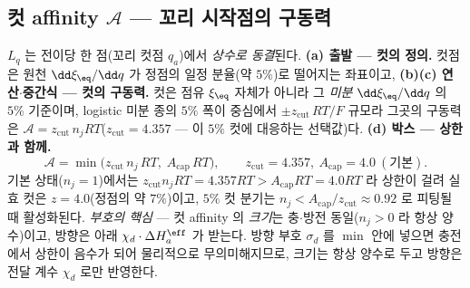 \subsection{컷 affinity $\mathcal A$ --- 꼬리 시작점의 구동력}\label{sec:lag-cut}
$L_q$ 는 전이당 한 점(꼬리 컷점 $q_a$)에서 \emph{상수로 동결}된다. \textbf{(a) 출발 --- 컷의 정의.} 컷점은 원천
$\dd\xi_\eq/\dd q$ 가 정점의 일정 분율(약 $5\%$)로 떨어지는 좌표이고, \textbf{(b)(c) 연산$\cdot$중간식 --- 컷의 구동력.}
컷은 점유 $\xi_\eq$ 자체가 아니라 그 \emph{미분} $\dd\xi_\eq/\dd q$ 의 $5\%$ 기준이며, logistic 미분 종의 $5\%$
폭이 중심에서 $\pm z_\mathrm{cut}\,RT/F$ 규모라 그곳의 구동력은 $\mathcal A=z_\mathrm{cut}\,n_jRT$($z_\mathrm{cut}=4.357$
--- 이 $5\%$ 컷에 대응하는 선택값)다. \textbf{(d) 박스 --- 상한과 함께.}
\begin{equation}
\mathcal A=\min\!\big(z_\mathrm{cut}\,n_j\,RT,\;A_\mathrm{cap}\,RT\big),
\qquad z_\mathrm{cut}=4.357,\ A_\mathrm{cap}=4.0\ (\text{기본}).
\label{eq:Acut}
\end{equation}
기본 상태($n_j{=}1$)에서는 $z_\mathrm{cut}n_jRT=4.357RT>A_\mathrm{cap}RT=4.0RT$ 라 상한이 걸려 실효
컷은 $z=4.0$(정점의 약 $7\%$)이고, $5\%$ 컷 분기는 $n_j<A_\mathrm{cap}/z_\mathrm{cut}\approx0.92$ 로
피팅될 때 활성화된다.
\emph{부호의 핵심} --- 컷 affinity 의 \emph{크기}는
충$\cdot$방전 동일($n_j>0$ 라 항상 양수)이고, 방향은 아래 $\chi_d\cdot\Delta H_a^\eff$ 가 받는다. 방향 부호 $\sigma_d$ 를
$\min$ 안에 넣으면 충전에서 상한이 음수가 되어 물리적으로 무의미해지므로, 크기는 항상 양수로 두고 방향은 전달
계수 $\chi_d$ 로만 반영한다.

